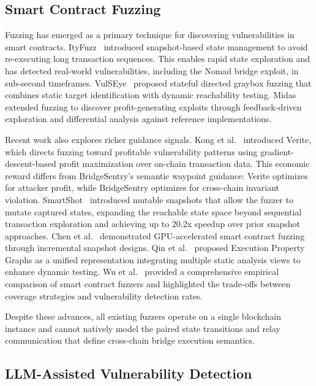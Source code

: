 \documentclass[journal]{IEEEtran}
\begin{document}
\subsection{Smart Contract Fuzzing}

Fuzzing has emerged as a primary technique for discovering vulnerabilities in smart contracts. ItyFuzz~\cite{shou2023ityfuzz} introduced snapshot-based state management to avoid re-executing long transaction sequences. This enables rapid state exploration and has detected real-world vulnerabilities, including the Nomad bridge exploit, in sub-second timeframes. VulSEye~\cite{liang2025vulseye} proposed stateful directed graybox fuzzing that combines static target identification with dynamic reachability testing. Midas~\cite{ye2024midas} extended fuzzing to discover profit-generating exploits through feedback-driven exploration and differential analysis against reference implementations.

Recent work also explores richer guidance signals. Kong et al.~\cite{kong2025fuzzing} introduced Verite, which directs fuzzing toward profitable vulnerability patterns using gradient-descent-based profit maximization over on-chain transaction data. This economic reward differs from BridgeSentry's semantic waypoint guidance: Verite optimizes for attacker profit, while BridgeSentry optimizes for cross-chain invariant violation. SmartShot~\cite{liang2025smartshot} introduced mutable snapshots that allow the fuzzer to mutate captured states, expanding the reachable state space beyond sequential transaction exploration and achieving up to 20.2x speedup over prior snapshot approaches. Chen et al.~\cite{chen2024gpufuzzing} demonstrated GPU-accelerated smart contract fuzzing through incremental snapshot designs. Qin et al.~\cite{qin2025epg} proposed Execution Property Graphs as a unified representation integrating multiple static analysis views to enhance dynamic testing. Wu et al.~\cite{wu2024fuzzers} provided a comprehensive empirical comparison of smart contract fuzzers and highlighted the trade-offs between coverage strategies and vulnerability detection rates.

Despite these advances, all existing fuzzers operate on a single blockchain instance and cannot natively model the paired state transitions and relay communication that define cross-chain bridge execution semantics.

\subsection{LLM-Assisted Vulnerability Detection}
\end{document}
